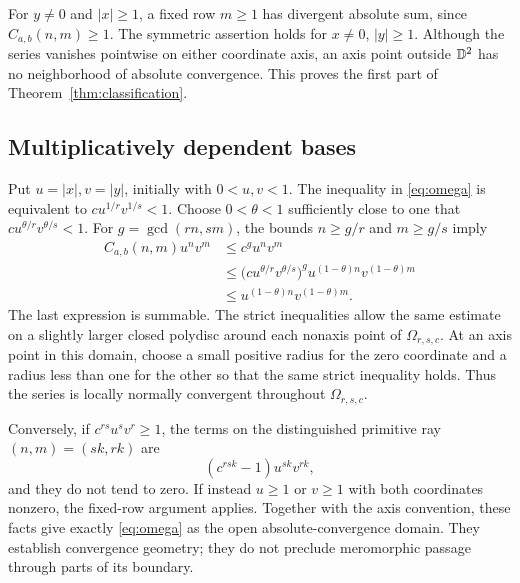 For \(y\ne0\) and \(|x|\geq1\), a fixed row \(m\geq1\) has divergent
absolute sum, since \(C_{a,b}(n,m)\geq1\). The symmetric assertion
holds for \(x\ne0\), \(|y|\geq1\).
Although the series vanishes pointwise on either coordinate axis,
an axis point outside \(\mathbb D^2\) has no neighborhood of absolute
convergence. This proves the first part of
Theorem~\ref{thm:classification}.

\subsection{Multiplicatively dependent bases}

Put \(u=|x|,v=|y|\), initially with \(0<u,v<1\).
The inequality in \eqref{eq:omega} is equivalent to
\(c u^{1/r}v^{1/s}<1\). Choose \(0<\theta<1\) sufficiently close to
one that \(c u^{\theta/r}v^{\theta/s}<1\).
For \(g=\gcd(rn,sm)\), the bounds \(n\geq g/r\) and \(m\geq g/s\)
imply
\begin{align*}
C_{a,b}(n,m)u^nv^m
&\leq c^g u^nv^m\\
&\leq \bigl(c u^{\theta/r}v^{\theta/s}\bigr)^g
u^{(1-\theta)n}v^{(1-\theta)m}\\
&\leq u^{(1-\theta)n}v^{(1-\theta)m}.
\end{align*}
The last expression is summable. The strict inequalities allow the
same estimate on a slightly larger closed polydisc around each
nonaxis point of \(\Omega_{r,s,c}\).
At an axis point in this domain, choose a small positive radius for
the zero coordinate and a radius less than one for the other so that
the same strict inequality holds. Thus the series is locally normally
convergent throughout \(\Omega_{r,s,c}\).

Conversely, if \(c^{rs}u^sv^r\geq1\), the terms on the distinguished
primitive ray \((n,m)=(sk,rk)\) are
\[
(c^{rsk}-1)u^{sk}v^{rk},
\]
and they do not tend to zero. If instead \(u\geq1\) or \(v\geq1\)
with both coordinates nonzero, the fixed-row argument applies.
Together with the axis convention, these facts give exactly
\eqref{eq:omega} as the open absolute-convergence domain.
They establish convergence geometry; they do not preclude
meromorphic passage through parts of its boundary.
